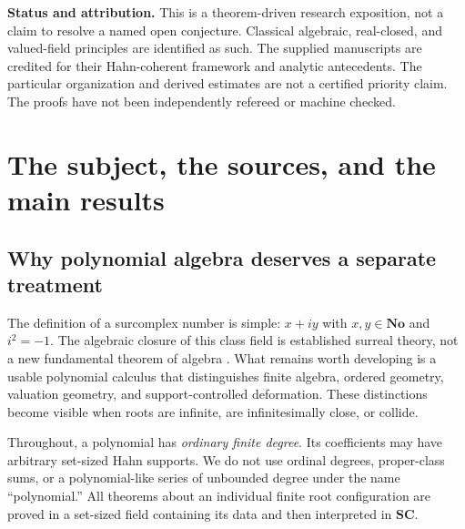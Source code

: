 \documentclass[11pt,letterpaper]{article}
\numberwithin{equation}{section}
\theoremstyle{definition}
\theoremstyle{remark}
\newcommand{\No}{\mathbf{No}}
\newcommand{\SC}{\mathbf{SC}}
\begin{document}
\begin{titlepage}
\begin{minipage}{0.94\textwidth}
\begin{abstract}
The algebraic part includes Hermite interpolation, resultants, Newton sums,
a universal residue pairing with an explicit dual basis, collision-stable
trace formulas, finite polynomial maps and ramification, and a class-safe
Nullstellensatz for finite polynomial systems. All infinite constructions
are justified by Hahn support, not by convergence of ordinary partial sums
in the fine surreal topology.
\end{abstract}
\end{minipage}
\vfill
\begin{minipage}{0.94\textwidth}\small
\textbf{Status and attribution.}
This is a theorem-driven research exposition, not a claim to resolve a named
open conjecture. Classical algebraic, real-closed, and valued-field
principles are identified as such. The supplied manuscripts are credited
for their Hahn-coherent framework and analytic antecedents. The particular
organization and derived estimates are not a certified priority claim.
The proofs have not been independently refereed or machine checked.
\end{minipage}
\end{titlepage}
\hypersetup{pageanchor=true}
\tableofcontents
\clearpage
{}

\section{The subject, the sources, and the main results}\label{sec:introduction}

\subsection{Why polynomial algebra deserves a separate treatment}
The definition of a surcomplex number is simple: $x+iy$ with $x,y\in\No$
and $i^2=-1$. The algebraic closure of this class field is established
surreal theory, not a new fundamental theorem of algebra
\cite{Gonshor,Poonen}. What remains worth developing is a usable polynomial
calculus that distinguishes finite algebra, ordered geometry, valuation
geometry, and support-controlled deformation. These distinctions become
visible when roots are infinite, are infinitesimally close, or collide.

Throughout, a polynomial has \emph{ordinary finite degree}. Its coefficients
may have arbitrary set-sized Hahn supports. We do not use ordinal degrees,
proper-class sums, or a polynomial-like series of unbounded degree under
the name ``polynomial.'' All theorems about an individual finite root
configuration are proved in a set-sized field containing its data and then
interpreted in $\SC$.
\end{document}

